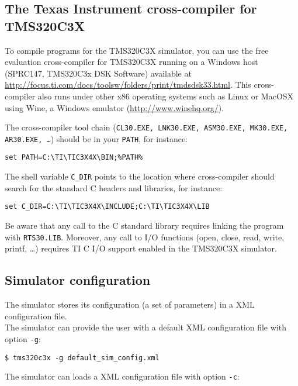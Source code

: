 \subsection{The Texas Instrument cross-compiler for TMS320C3X}
\label{tms320c3x_cross_compiler}

To compile programs for the TMS320C3X simulator, you can use the free evaluation cross-compiler for TMS320C3X running on a Windows host (SPRC147, TMS320C3x DSK Software) available at \url{http://focus.ti.com/docs/toolsw/folders/print/tmdsdsk33.html}.
This cross-compiler also runs under other x86 operating systems such as Linux or MacOSX using Wine, a Windows emulator (\url{http://www.winehq.org/}).

The cross-compiler tool chain (\texttt{CL30.EXE, LNK30.EXE, ASM30.EXE, MK30.EXE, AR30.EXE, \ldots}) should be in your \texttt{PATH}, for instance:
\begin{verbatim}
set PATH=C:\TI\TIC3X4X\BIN;%PATH%
\end{verbatim}

The shell variable \texttt{C\_DIR} points to the location where cross-compiler should search for the standard C headers and libraries, for instance:
\begin{verbatim}
set C_DIR=C:\TI\TIC3X4X\INCLUDE;C:\TI\TIC3X4X\LIB
\end{verbatim}

Be aware that any call to the C standard library requires linking the program with \texttt{RTS30.LIB}.
Moreover, any call to I/O functions (open, close, read, write, printf, \ldots) requires TI C I/O support enabled in the TMS320C3X simulator.

\subsection{Simulator configuration}

\noindent The simulator stores its configuration (a set of parameters) in a XML configuration file. 
\newline\\
\noindent The simulator can provide the user with a default XML configuration file with option \texttt{-g}:

\begin{verbatim}
$ tms320c3x -g default_sim_config.xml
\end{verbatim}

\noindent The simulator can loads a XML configuration file with option \texttt{-c}:

